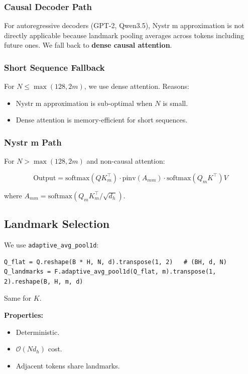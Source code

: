 \subsubsection{Causal Decoder Path}

For autoregressive decoders (GPT-2, Qwen3.5), Nystr m approximation is 
not directly applicable because landmark pooling averages across tokens 
including future ones. We fall back to \textbf{dense causal attention}.

\subsubsection{Short Sequence Fallback}

For $N \leq \max(128, 2m)$, we use dense attention. Reasons:

\begin{itemize}
\item Nystr m approximation is sub-optimal when $N$ is small.
\item Dense attention is memory-efficient for short sequences.

\end{itemize}
\subsubsection{Nystr m Path}

For $N > \max(128, 2m)$ and non-causal attention:

\[
\text{Output} = \text{softmax}(Q K_m^\top) \cdot \text{pinv}(A_{mm}) \cdot \text{softmax}(Q_m K^\top) V
\tag{4.1}
\]

where $A_{mm} = \text{softmax}(Q_m K_m^\top / \sqrt{d_h})$.

\subsection{Landmark Selection}

We use \texttt{adaptive\_avg\_pool1d}:

\begin{lstlisting}
Q_flat = Q.reshape(B * H, N, d).transpose(1, 2)   # (BH, d, N)
Q_landmarks = F.adaptive_avg_pool1d(Q_flat, m).transpose(1, 2).reshape(B, H, m, d)
\end{lstlisting}

Same for $K$.

\textbf{Properties:}
\begin{itemize}
\item Deterministic.
\item $\mathcal{O}(N d_h)$ cost.
\item Adjacent tokens share landmarks.

\end{itemize}
